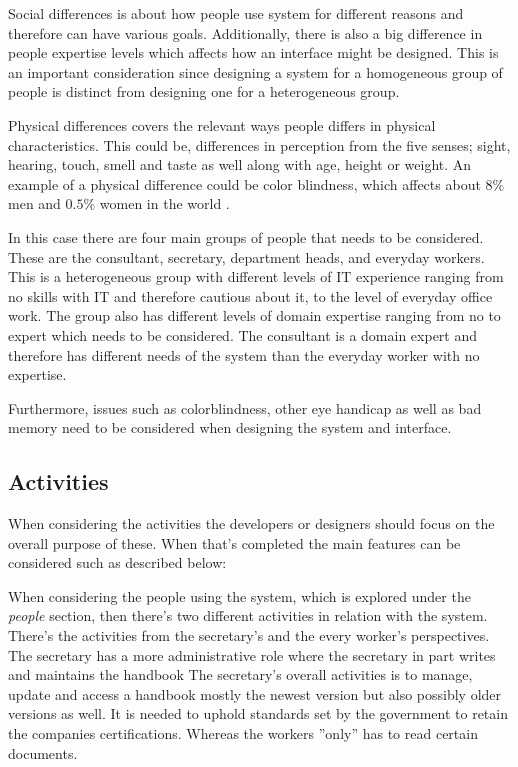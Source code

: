 Social differences is about how people use system for different reasons and therefore can have various goals. 
Additionally, there is also a big difference in people expertise levels which affects how an interface might be designed.
This is an important consideration since designing a system for a homogeneous group of people is  distinct from designing one for a heterogeneous group.

Physical differences covers the relevant ways people differs in physical characteristics.
This could be, differences in perception from the five senses; sight, hearing, touch, smell and taste as well along with age, height or weight. An example of a physical difference could be color blindness, which affects about $8\%$ men and $0.5\%$ women in the world \cite{ColourBlind}.

In this case there are four main groups of people that needs to be considered. These are the consultant, secretary, department heads, and everyday workers. 
This is a heterogeneous group with different levels of IT experience ranging from no skills with IT and therefore cautious about it, to the level of everyday office work.
The group also has different levels of domain expertise ranging from no to expert which needs to be considered. 
The consultant is a domain expert and therefore has different needs of the system than the everyday worker with no expertise.

Furthermore, issues such as colorblindness, other eye handicap as well as bad memory need to be considered when designing the system and interface.

\subsection{Activities}
When considering the activities the developers or designers should focus on the overall purpose of these. When that's completed the main features can be considered such as described below:

When considering the people using the system, which is explored under the \textit{people} section, then there's two different activities in relation with the system.
There's the activities from the secretary's and the every worker's perspectives.
The secretary has a more administrative role where the secretary in part writes and maintains the handbook
The secretary's overall activities is to manage, update and access a handbook mostly the newest version but also possibly older versions as well. 
It is needed to uphold standards set by the government to retain the companies certifications.
Whereas the workers ''only'' has to read certain documents.

